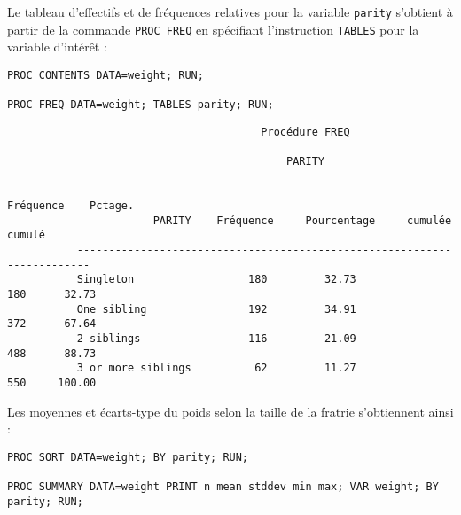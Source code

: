 Le tableau d'effectifs et de fréquences relatives pour la variable
\texttt{parity} s'obtient à partir de la commande \texttt{PROC FREQ} en
spécifiant l'instruction \texttt{TABLES} pour la variable d'intérêt :
\begin{verbatim}
PROC CONTENTS DATA=weight; RUN;

PROC FREQ DATA=weight; TABLES parity; RUN;
\end{verbatim}

\begin{verbatim}
                                        Procédure FREQ

                                            PARITY

                                                               Fréquence    Pctage.
                       PARITY    Fréquence     Pourcentage     cumulée      cumulé
           ------------------------------------------------------------------------
           Singleton                  180         32.73             180      32.73
           One sibling                192         34.91             372      67.64
           2 siblings                 116         21.09             488      88.73
           3 or more siblings          62         11.27             550     100.00
\end{verbatim}

Les moyennes et écarts-type du poids selon la taille de la fratrie
s'obtiennent ainsi :
\begin{verbatim}
PROC SORT DATA=weight; BY parity; RUN;

PROC SUMMARY DATA=weight PRINT n mean stddev min max; VAR weight; BY parity; RUN;
\end{verbatim}

